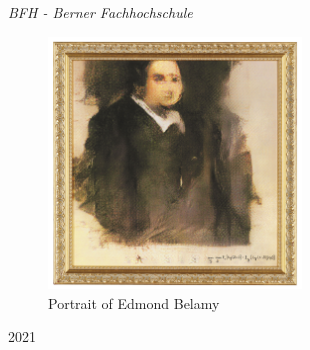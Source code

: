 \begin{titlepage}
	\textit{BFH - Berner Fachhochschule} %

	\vfill %


	\begin{figure}[h!]
		\begin{center}
			\includegraphics[width=0.6\textwidth]{../common/resources/portrait.jpg}
		\end{center}
		\caption{Portrait of Edmond Belamy \cite{Christies:PortraitEdmundBelamy}}
		\label{fig:Portrait of Edmond Belamy}
	\end{figure}

	\vspace{0.3\baselineskip} %

	2021 %

\end{titlepage}
